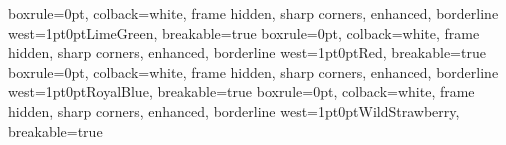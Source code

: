 \usepackage[swedish]{babel}

\usepackage{enumerate}

\usepackage{hyperref} %

\usepackage{physics}
\usepackage{marvosym}
\usepackage{amsmath, amssymb, amsthm}
\newtheorem{theorem}{Sats}
\newtheorem{lemma}{Lemma}
\newtheorem{corollary}{Korollarium}

\usepackage{soul} %
\usepackage[dvipsnames]{xcolor}
\usepackage[most]{tcolorbox}
{
	boxrule=0pt,
	colback=white,
	frame hidden,
	sharp corners,
	enhanced,
	borderline west={1pt}{0pt}{LimeGreen},
	breakable=true
}
{
	boxrule=0pt,
	colback=white,
	frame hidden,
	sharp corners,
	enhanced,
	borderline west={1pt}{0pt}{Red},
	breakable=true
}
{
	boxrule=0pt,
	colback=white,
	frame hidden,
	sharp corners,
	enhanced,
	borderline west={1pt}{0pt}{RoyalBlue},
	breakable=true
}
{
	boxrule=0pt,
	colback=white,
	frame hidden,
	sharp corners,
	enhanced,
	borderline west={1pt}{0pt}{WildStrawberry},
	breakable=true
}

\renewcommand{\qedsymbol}{$\blacksquare$}

\newcommand{\contra}{\text{\Lightning}}

\newcommand{\SA}{\text{ s.a. }}

\newcommand{\matr}[1]{\mathbf{#1}}

\newcommand{\defeq}{\stackrel{\Delta}{=}}
\newcommand{\defeqto}{\stackrel{\text{def}}{=}}
\newcommand{\leteq}{\stackrel{\text{låt}}{=}}

\newcommand{\pgrad}{\mathrm{grad}\,}
\newcommand{\spn}{\operatorname{span}}
\renewcommand{\ker}{\operatorname{Ker}}
\newcommand{\noll}{\operatorname{Noll}}
\newcommand{\kol}{\operatorname{Kolonn}}
\newcommand{\nullity}{\operatorname{nullity}}
\newcommand{\nolldim}{\operatorname{nolldim}}
\newcommand{\rang}{\operatorname{rang}}
\newcommand{\rnk}{\operatorname{rank}}

\newenvironment{amatrix}[1]{%
  \left(\begin{array}{@{}*{#1}{c}|c@{}}
}{%
  \end{array}\right)
}

\newcommand{\eps}{\varepsilon}
